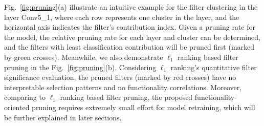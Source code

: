 \documentclass{article} %
\begin{document}
Fig.~\ref{fig:pruning}(a) illustrate an intuitive example for the filter clustering in the layer Conv5\_1, where each row represents one cluster in the layer, and the horizontal axis indicates the filter's contribution index.
	Given a pruning rate for the model, the relative pruning rate for each layer and cluster can be determined, and the filters with least classification contribution will be pruned first (marked by green crosses).
Meanwhile, we also demonstrate $\ell_1$ ranking based filter pruning in the Fig.~\ref{fig:pruning}(b).
	Considering $\ell_1$ ranking's quantitative filter significance evaluation, the pruned filters (marked by red crosses) have no interpretable selection patterns and no functionality correlations.
	Moreover, comparing to $\ell_1$ ranking based filter pruning, the proposed functionality-oriented pruning requires extremely small effort for model retraining, which will be further explained in later sections.
\end{document}
